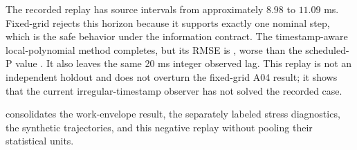 The recorded replay has source intervals from approximately $8.98$ to $11.09$ ms. Fixed-grid \FutureOOne{} rejects this horizon because it supports exactly one nominal step, which is the safe behavior under the information contract. The timestamp-aware local-polynomial method completes, but its RMSE is \RecordedLocalPolyRMSE, worse than the scheduled-P value \RecordedBaselineRMSE. It also leaves the same 20 ms integer observed lag. This replay is not an independent holdout and does not overturn the fixed-grid A04 result; it shows that the current irregular-timestamp observer has not solved the recorded case.

 consolidates the work-envelope result, the separately
labeled stress diagnostics, the synthetic trajectories, and this negative
replay without pooling their statistical units.
